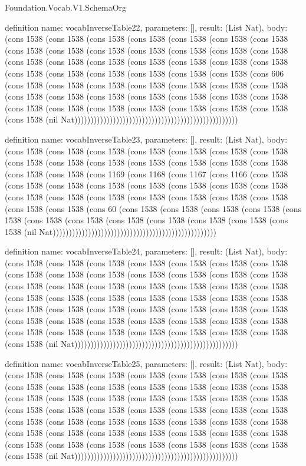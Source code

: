 \begin{lexlean}{Foundation.Vocab.V1.SchemaOrg}
\begin{semanticmodule}
definition{
  name: vocabInverseTable22,
  parameters: [],
  result: (List Nat),
  body: (cons 1538 (cons 1538 (cons 1538 (cons 1538 (cons 1538 (cons 1538 (cons 1538 (cons 1538 (cons 1538 (cons 1538 (cons 1538 (cons 1538 (cons 1538 (cons 1538 (cons 1538 (cons 1538 (cons 1538 (cons 1538 (cons 1538 (cons 1538 (cons 1538 (cons 1538 (cons 1538 (cons 1538 (cons 1538 (cons 1538 (cons 1538 (cons 606 (cons 1538 (cons 1538 (cons 1538 (cons 1538 (cons 1538 (cons 1538 (cons 1538 (cons 1538 (cons 1538 (cons 1538 (cons 1538 (cons 1538 (cons 1538 (cons 1538 (cons 1538 (cons 1538 (cons 1538 (cons 1538 (cons 1538 (cons 1538 (cons 1538 (cons 1538 (nil Nat)))))))))))))))))))))))))))))))))))))))))))))))))))
}

definition{
  name: vocabInverseTable23,
  parameters: [],
  result: (List Nat),
  body: (cons 1538 (cons 1538 (cons 1538 (cons 1538 (cons 1538 (cons 1538 (cons 1538 (cons 1538 (cons 1538 (cons 1538 (cons 1538 (cons 1538 (cons 1538 (cons 1538 (cons 1538 (cons 1538 (cons 1169 (cons 1168 (cons 1167 (cons 1166 (cons 1538 (cons 1538 (cons 1538 (cons 1538 (cons 1538 (cons 1538 (cons 1538 (cons 1538 (cons 1538 (cons 1538 (cons 1538 (cons 1538 (cons 1538 (cons 1538 (cons 1538 (cons 1538 (cons 1538 (cons 60 (cons 1538 (cons 1538 (cons 1538 (cons 1538 (cons 1538 (cons 1538 (cons 1538 (cons 1538 (cons 1538 (cons 1538 (cons 1538 (cons 1538 (nil Nat)))))))))))))))))))))))))))))))))))))))))))))))))))
}

definition{
  name: vocabInverseTable24,
  parameters: [],
  result: (List Nat),
  body: (cons 1538 (cons 1538 (cons 1538 (cons 1538 (cons 1538 (cons 1538 (cons 1538 (cons 1538 (cons 1538 (cons 1538 (cons 1538 (cons 1538 (cons 1538 (cons 1538 (cons 1538 (cons 1538 (cons 1538 (cons 1538 (cons 1538 (cons 1538 (cons 1538 (cons 1538 (cons 1538 (cons 1538 (cons 1538 (cons 1538 (cons 1538 (cons 1538 (cons 1538 (cons 1538 (cons 1538 (cons 1538 (cons 1538 (cons 1538 (cons 1538 (cons 1538 (cons 1538 (cons 1538 (cons 1538 (cons 1538 (cons 1538 (cons 1538 (cons 1538 (cons 1538 (cons 1538 (cons 1538 (cons 1538 (cons 1538 (cons 1538 (cons 1538 (nil Nat)))))))))))))))))))))))))))))))))))))))))))))))))))
}

definition{
  name: vocabInverseTable25,
  parameters: [],
  result: (List Nat),
  body: (cons 1538 (cons 1538 (cons 1538 (cons 1538 (cons 1538 (cons 1538 (cons 1538 (cons 1538 (cons 1538 (cons 1538 (cons 1538 (cons 1538 (cons 1538 (cons 1538 (cons 1538 (cons 1538 (cons 1538 (cons 1538 (cons 1538 (cons 1538 (cons 1538 (cons 1538 (cons 1538 (cons 1538 (cons 1538 (cons 1538 (cons 1538 (cons 1538 (cons 1538 (cons 1538 (cons 1538 (cons 1538 (cons 1538 (cons 1538 (cons 1538 (cons 1538 (cons 1538 (cons 1538 (cons 1538 (cons 1538 (cons 1538 (cons 1538 (cons 1538 (cons 1538 (cons 1538 (cons 1538 (cons 1538 (cons 1538 (cons 1538 (cons 1538 (nil Nat)))))))))))))))))))))))))))))))))))))))))))))))))))
}


\end{semanticmodule}
\end{lexlean}

